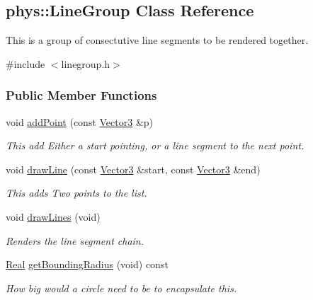 \hypertarget{classphys_1_1LineGroup}{
\subsection{phys::LineGroup Class Reference}
\label{classphys_1_1LineGroup}
}


This is a group of consectutive line segments to be rendered together.  




{\ttfamily \#include $<$linegroup.h$>$}

\subsubsection*{Public Member Functions}
\begin{DoxyCompactItemize}
\item 
void \hyperlink{classphys_1_1LineGroup_a042a8facc505866f619cfc043a820f03}{addPoint} (const \hyperlink{classphys_1_1Vector3}{Vector3} \&p)
\begin{DoxyCompactList}\small\item\em This add Either a start pointing, or a line segment to the next point. \item\end{DoxyCompactList}\item 
void \hyperlink{classphys_1_1LineGroup_a141db62ea17d94b9bce421e5df5a8d89}{drawLine} (const \hyperlink{classphys_1_1Vector3}{Vector3} \&start, const \hyperlink{classphys_1_1Vector3}{Vector3} \&end)
\begin{DoxyCompactList}\small\item\em This adds Two points to the list. \item\end{DoxyCompactList}\item 
void \hyperlink{classphys_1_1LineGroup_ade1bb4f8e1164e1b8d7aeabbc970b79d}{drawLines} (void)
\begin{DoxyCompactList}\small\item\em Renders the line segment chain. \item\end{DoxyCompactList}\item 
\hyperlink{namespacephys_af7eb897198d265b8e868f45240230d5f}{Real} \hyperlink{classphys_1_1LineGroup_a9dbbd74f5256ee67454ef6ede752dc32}{getBoundingRadius} (void) const 
\begin{DoxyCompactList}\small\item\em How big would a circle need to be to encapsulate this. \item\end{DoxyCompactList}\item 

\end{DoxyCompactItemize}
